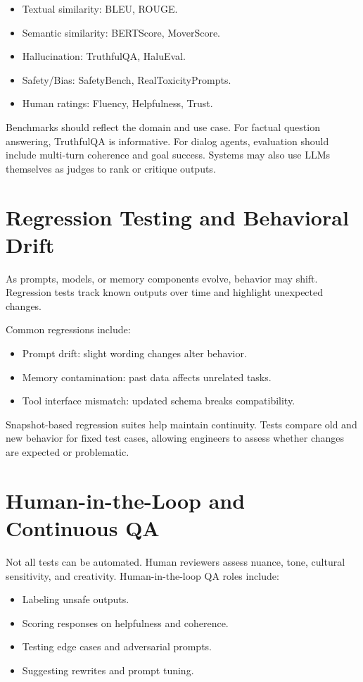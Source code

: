 \documentclass{book}
\begin{document}
\begin{itemize}
  \item Textual similarity: BLEU, ROUGE.
  \item Semantic similarity: BERTScore, MoverScore.
  \item Hallucination: TruthfulQA, HaluEval.
  \item Safety/Bias: SafetyBench, RealToxicityPrompts.
  \item Human ratings: Fluency, Helpfulness, Trust.
\end{itemize}

Benchmarks should reflect the domain and use case. For factual question answering, TruthfulQA is informative. For dialog agents, evaluation should include multi-turn coherence and goal success. Systems may also use LLMs themselves as judges to rank or critique outputs.

\section{Regression Testing and Behavioral Drift}

As prompts, models, or memory components evolve, behavior may shift. Regression tests track known outputs over time and highlight unexpected changes.

Common regressions include:

\begin{itemize}
  \item Prompt drift: slight wording changes alter behavior.
  \item Memory contamination: past data affects unrelated tasks.
  \item Tool interface mismatch: updated schema breaks compatibility.
\end{itemize}

Snapshot-based regression suites help maintain continuity. Tests compare old and new behavior for fixed test cases, allowing engineers to assess whether changes are expected or problematic.

\section{Human-in-the-Loop and Continuous QA}

Not all tests can be automated. Human reviewers assess nuance, tone, cultural sensitivity, and creativity. Human-in-the-loop QA roles include:

\begin{itemize}
  \item Labeling unsafe outputs.
  \item Scoring responses on helpfulness and coherence.
  \item Testing edge cases and adversarial prompts.
  \item Suggesting rewrites and prompt tuning.
\end{itemize}
\end{document}

